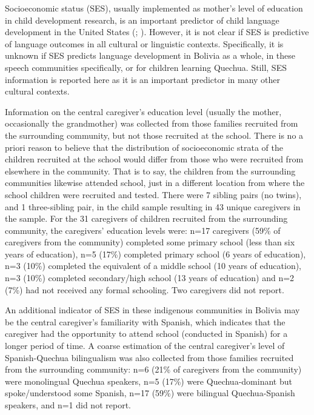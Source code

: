 \documentclass[a4paper,man,floatsintext,natbib,donotrepeattitle, apacite]{apa6}
\begin{document}
Socioeconomic status (SES), usually implemented as mother's level of education in child development research, is an important predictor of child language development in the United States (\citealt{hoffSpecificityEnvironmentalInfluence2003}; \citealt{paceIdentifyingPathwaysSocioeconomic2017}). However, it is not clear if SES is predictive of language outcomes in all cultural or linguistic contexts. Specifically, it is unknown if SES predicts language development in Bolivia as a whole, in these speech communities specifically, or for children learning Quechua. Still, SES information is reported here as it is an important predictor in many other cultural contexts. 

Information on the central caregiver's education level (usually the mother, occasionally the grandmother) was collected from those families recruited from the surrounding community, but not those recruited at the school. There is no a priori reason to believe that the distribution of socioeconomic strata of the children recruited at the school would differ from those who were recruited from elsewhere in the community. That is to say, the children from the surrounding communities likewise attended school, just in a different location from where the school children were recruited and tested. There were 7 sibling pairs (no twins), and 1 three-sibling pair, in the child sample resulting in 43 unique caregivers in the sample. For the 31 caregivers of children recruited from the surrounding community, the caregivers' education levels were: n=17 caregivers (59\% of caregivers from the community) completed some primary school (less than six years of education), n=5 (17\%) completed primary school (6 years of education), n=3 (10\%) completed the equivalent of a middle school (10 years of education), n=3 (10\%) completed secondary/high school (13 years of education) and n=2 (7\%) had not received any formal schooling. Two caregivers did not report.  

An additional indicator of SES in these indigenous communities in Bolivia may be the central caregiver's familiarity with Spanish, which indicates that the caregiver had the opportunity to attend school (conducted in Spanish) for a longer period of time. A coarse estimation of the central caregiver's level of Spanish-Quechua bilingualism was also collected from those families recruited from the surrounding community: n=6 (21\% of caregivers from the community) were monolingual Quechua speakers, n=5 (17\%) were Quechua-dominant but spoke/understood some Spanish, n=17 (59\%) were bilingual Quechua-Spanish speakers, and n=1 did not report. 
\end{document}
